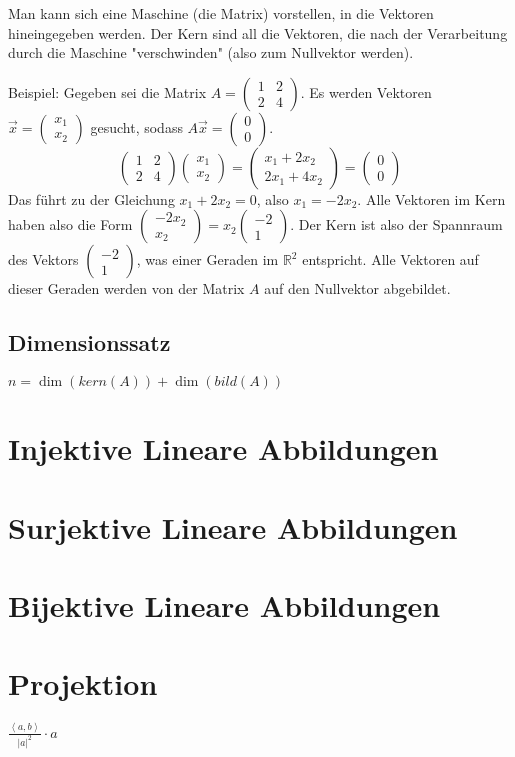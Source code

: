 Man kann sich eine Maschine (die Matrix) vorstellen, in die Vektoren hineingegeben werden. Der Kern sind all die Vektoren, die nach der Verarbeitung durch die Maschine "verschwinden" (also zum Nullvektor werden).

Beispiel:
Gegeben sei die Matrix \(A = \begin{pmatrix} 1 & 2 \\ 2 & 4 \end{pmatrix}\). Es werden Vektoren \(\vec{x} = \begin{pmatrix} x_1 \\ x_2 \end{pmatrix}\) gesucht, sodass \(A\vec{x} = \begin{pmatrix} 0 \\ 0 \end{pmatrix}\).
\[ \begin{pmatrix} 1 & 2 \\ 2 & 4 \end{pmatrix} \begin{pmatrix} x_1 \\ x_2 \end{pmatrix} = \begin{pmatrix} x_1 + 2x_2 \\ 2x_1 + 4x_2 \end{pmatrix} = \begin{pmatrix} 0 \\ 0 \end{pmatrix} \]
Das führt zu der Gleichung \(x_1 + 2x_2 = 0\), also \(x_1 = -2x_2\).
Alle Vektoren im Kern haben also die Form \(\begin{pmatrix} -2x_2 \\ x_2 \end{pmatrix} = x_2 \begin{pmatrix} -2 \\ 1 \end{pmatrix}\).
Der Kern ist also der Spannraum des Vektors \(\begin{pmatrix} -2 \\ 1 \end{pmatrix}\), was einer Geraden im \(\mathbb{R}^2\) entspricht. Alle Vektoren auf dieser Geraden werden von der Matrix \(A\) auf den Nullvektor abgebildet.

\subsection{Dimensionssatz}

$n = \dim(kern(A)) + \dim(bild(A))$

\section{Injektive Lineare Abbildungen}
\section{Surjektive Lineare Abbildungen}
\section{Bijektive Lineare Abbildungen}

\section{Projektion}

$\frac{\left\langle a, b \right\rangle}{\left|a\right|^2} \cdot a$